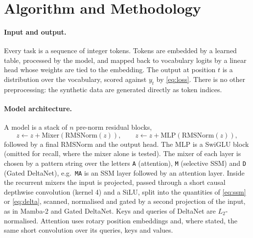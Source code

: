 \section{Algorithm and Methodology}
\label{sec:method}

\paragraph{Input and output.} Every task is a sequence of integer tokens. Tokens are embedded by a learned
table, processed by the model, and mapped back to vocabulary logits by a linear head whose weights are tied
to the embedding. The output at position $t$ is a distribution over the vocabulary, scored against $y_t$
by \eqref{eq:loss}. There is no other preprocessing: the synthetic data are generated directly as token
indices.

\paragraph{Model architecture.} A model is a stack of $n$ pre-norm residual blocks,
\[
  z \leftarrow z + \mathrm{Mixer}(\mathrm{RMSNorm}(z)), \qquad z \leftarrow z + \mathrm{MLP}(\mathrm{RMSNorm}(z)),
\]
followed by a final RMSNorm and the output head. The MLP is a SwiGLU block (omitted for recall, where the
mixer alone is tested). The mixer of each layer is chosen by a pattern string over the letters
\texttt{A} (attention), \texttt{M} (selective SSM) and \texttt{D} (Gated DeltaNet), e.g.\ \texttt{MA} is an
SSM layer followed by an attention layer. Inside the recurrent mixers the input is projected, passed
through a short causal depthwise convolution (kernel 4) and a SiLU, split into the quantities of
\eqref{eq:ssm} or \eqref{eq:delta}, scanned, normalised and gated by a second projection of the input, as
in Mamba-2 and Gated DeltaNet. Keys and queries of DeltaNet are $L_2$-normalised. Attention uses rotary
position embeddings and, where stated, the same short convolution over its queries, keys and values.

